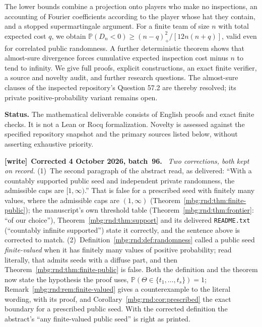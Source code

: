 \documentclass[11pt,letterpaper]{article}
\theoremstyle{definition}
\newcommand{\Prb}{\mathbb P}
\newenvironment{writenote}[1][]{\par\smallskip\begingroup\small
 \noindent\textbf{[write]}\if\relax\detokenize{#1}\relax\else~\textbf{#1.}\fi\ }%
 {\par\endgroup\smallskip}
\begin{document}
The lower bounds combine a projection onto players who make no
inspections, an accounting of Fourier coefficients according to the
player whose hat they contain, and a stopped supermartingale argument.
For a finite team of size $n$ with total expected cost $q$, we obtain
$\Prb(D_n<0)\ge (n-q)_+^2/[12n(n+q)]$, valid even for correlated public
randomness. A further deterministic theorem shows that almost-sure
divergence forces cumulative expected inspection cost minus $n$ to tend
to infinity. We give full proofs, explicit constructions, an exact
finite verifier, a source and novelty audit, and further research
questions. The almost-sure clauses of the inspected repository's
Question 57.2 are thereby resolved; its private positive-probability
variant remains open.

\begin{resultbox}
\textbf{Status.} The mathematical deliverable consists of English
proofs and exact finite checks. It is not a Lean or Rocq formalization.
Novelty is assessed against the specified repository snapshot and the
primary sources listed below, without asserting exhaustive priority.
\end{resultbox}

\begin{writenote}[Corrected 4 October 2026, batch~96]
\emph{Two corrections, both kept on record.} (1)~The second paragraph of the abstract read, as delivered: ``With a countably supported public seed and independent private randomness, the admissible caps are $[1,\infty)$.'' That is false for a prescribed seed with finitely many values, where the admissible caps are $(1,\infty)$ (Theorem~\ref{mbg:rnd:thm:finite-public}); the manuscript's own threshold table (Theorem~\ref{mbg:rnd:thm:frontier}: ``of our choice''), Theorem~\ref{mbg:rnd:thm:support} and its delivered \texttt{README.txt} (``countably infinite supported'') state it correctly, and the sentence above is corrected to match. (2)~Definition~\ref{mbg:rnd:def:randomness} called a public seed \emph{finite-valued} when it has finitely many values of positive probability; read literally, that admits seeds with a diffuse part, and then Theorem~\ref{mbg:rnd:thm:finite-public} is false. Both the definition and the theorem now state the hypothesis the proof uses, $\Prb(\Theta\in\{t_1,\ldots,t_s\})=1$; Remark~\ref{mbg:rnd:rem:finite-valued} gives a counterexample to the literal wording, with its proof, and Corollary~\ref{mbg:rnd:cor:prescribed} the exact boundary for a prescribed public seed. With the corrected definition the abstract's ``any finite-valued public seed'' is right as printed.
\end{writenote}
\end{document}
